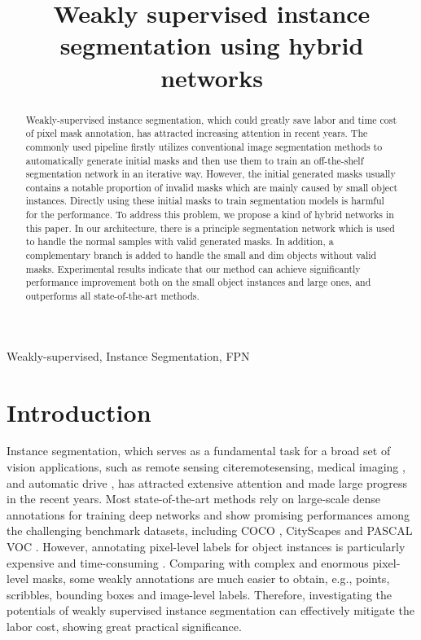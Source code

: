 \documentclass{article}
\title{Weakly supervised instance segmentation using hybrid networks}
\begin{document}
\maketitle
\begin{abstract}
Weakly-supervised instance segmentation, which could greatly save labor and time cost of pixel mask annotation, has attracted increasing attention in recent years.
The commonly used pipeline firstly utilizes conventional image segmentation methods to automatically generate initial masks and then use them to train an off-the-shelf segmentation network in an iterative way.
However, the initial generated masks usually contains a notable proportion of invalid masks which are mainly caused by small object instances.
Directly using these initial masks to train segmentation models is harmful for the performance.
To address this problem, we propose a kind of hybrid networks in this paper.
In our architecture, there is a principle segmentation network which is used to handle the normal samples with valid generated masks.
In addition, a complementary branch is added to handle the small and dim objects without valid masks.
Experimental results indicate that our method can achieve significantly performance improvement both on the small object instances and large ones, and outperforms all state-of-the-art methods.

\end{abstract}
\begin{keywords} Weakly-supervised, Instance Segmentation, FPN
\end{keywords}
\section{Introduction}
\label{sec:intro}
Instance segmentation, which serves as a fundamental task for a broad set of vision applications, such as remote sensing cite{remotesensing}, medical imaging \cite{medicalimaging}, and automatic drive \cite{driving}, has attracted extensive attention and made large progress in the recent years.
Most state-of-the-art methods \cite{maskrcnn, Panet} rely on large-scale dense annotations for training deep networks and show promising performances among the challenging benchmark datasets, including COCO \cite{lin2014microsoft}, CityScapes \cite{CityScapes} and PASCAL VOC \cite{everingham2010pascal}.
However, annotating pixel-level labels for object instances is particularly expensive and time-consuming \cite{russakovsky2015imagenet}.
Comparing with complex and enormous pixel-level masks, some weakly annotations are much easier to obtain, e.g., points, scribbles, bounding boxes and image-level labels.
Therefore, investigating the potentials of weakly supervised instance segmentation can effectively mitigate the labor cost, showing great practical significance.
\end{document}
